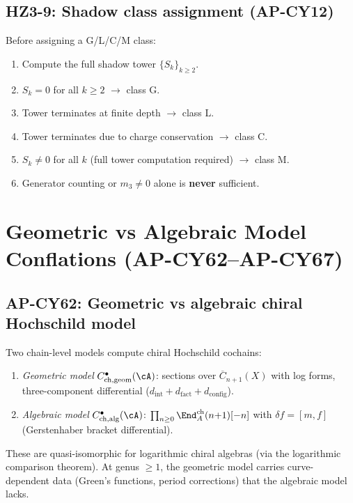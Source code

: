 \subsection{HZ3-9: Shadow class assignment (AP-CY12)}

Before assigning a G/L/C/M class:
\begin{enumerate}[nosep]
\item Compute the full shadow tower $\{S_k\}_{k \ge 2}$.
\item $S_k = 0$ for all $k \ge 2$ $\to$ class G.
\item Tower terminates at finite depth $\to$ class L.
\item Tower terminates due to charge conservation $\to$ class C.
\item $S_k \neq 0$ for all $k$ (full tower computation required)
      $\to$ class M.
\item Generator counting or $m_3 \neq 0$ alone is \textbf{never}
      sufficient.
\end{enumerate}

\section{Geometric vs Algebraic Model Conflations (AP-CY62--AP-CY67)}
\label{sec:ap-geom-alg-model}

\subsection{AP-CY62: Geometric vs algebraic chiral Hochschild model}

Two chain-level models compute chiral Hochschild cochains:
\begin{enumerate}[label=(\alph*),nosep]
\item \emph{Geometric model} $C^\bullet_{\mathrm{ch,geom}}(\cA)$:
      sections over $\overline{C}_{n+1}(X)$ with log forms, three-component
      differential ($d_{\mathrm{int}} + d_{\mathrm{fact}} + d_{\mathrm{config}}$).
\item \emph{Algebraic model} $C^\bullet_{\mathrm{ch,alg}}(\cA)$:
      $\prod_{n \ge 0} \End^{\mathrm{ch}}_A(n{+}1)[-n]$ with
      $\delta f = [m, f]$ (Gerstenhaber bracket differential).
\end{enumerate}
These are quasi-isomorphic for logarithmic chiral algebras (via the
logarithmic comparison theorem).  At genus $\ge 1$, the geometric
model carries curve-dependent data (Green's functions, period
corrections) that the algebraic model lacks.

